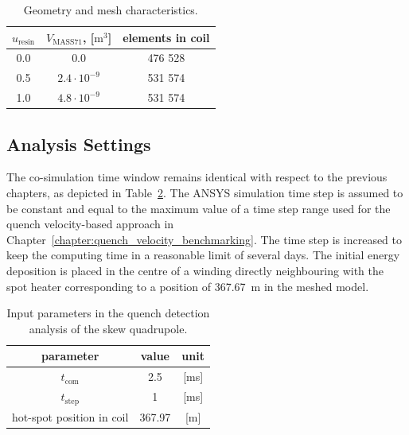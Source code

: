 \begin{table}[H]
    \caption{Geometry and mesh characteristics.} 
    \vspace{-1.em} 
    \fontsize{10}{10}
    \selectfont 
    \renewcommand{\arraystretch}{1.5}
    \begin{center}
        \begin{tabular}{ | c | c | c | }  
        \hline
        $u_\text{resin}$ & $V_\text{MASS71}$, [$\text{m}^3$] & elements in coil \\
        \hline
        0.0 & 0.0 & 476 528 \\
        0.5 & $2.4 \cdot 10^{-9}$ & 531 574 \\
        1.0 & $4.8 \cdot 10^{-9}$ & 531 574 \\
        \hline 
        \end{tabular}
    \end{center}  
     \label{table: skew_quad_geometry_cases} 
 \end{table}

\subsection{Analysis Settings}

The co-simulation time window remains identical with respect to the previous chapters, as depicted in Table~\ref{table: skew_quad_quench_detect_input_params}. The ANSYS simulation time step is assumed to be constant and equal to the maximum value of a time step range used for the quench velocity-based approach in Chapter~\ref{chapter:quench_velocity_benchmarking}. The time step is increased to keep the computing time in a reasonable limit of several days. The initial energy deposition is placed in the centre of a winding directly neighbouring with the spot heater corresponding to a position of 367.67~m in the meshed model.

\begin{table}[H]
    \caption{Input parameters in the quench detection analysis of the skew quadrupole.} 
    \vspace{-1.em} 
    \fontsize{10}{10}
    \selectfont 
    \renewcommand{\arraystretch}{1.5}
    \begin{center}
        \begin{tabular}{ ccc }  
        \hline
        parameter & value & unit \\
        \hline
        $t_\text{com}$ & 2.5 & [ms] \\
        $t_\text{step}$ & 1 & [ms] \\ 
        hot-spot position in coil & 367.97 & [m] \\
        \hline 
        \end{tabular}
    \end{center}  
     \label{table: skew_quad_quench_detect_input_params} 
 \end{table}

